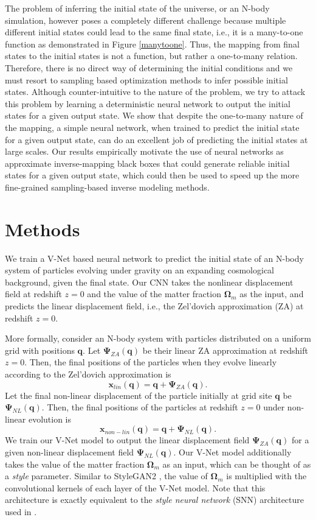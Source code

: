 \documentclass[10pt]{article}
\begin{document}
The problem of inferring the initial state of the universe, or an N-body simulation, however poses a completely different challenge because multiple different initial states could lead to the same final state, i.e., it is a many-to-one function as demonstrated in Figure \ref{manytoone}. Thus, the mapping from final states to the initial states is not a function, but rather a one-to-many relation. Therefore, there is no direct way of determining the initial conditions and we must resort to sampling based optimization methods to infer possible initial states. Although counter-intuitive to the nature of the problem, we try to attack this problem by learning a deterministic neural network to output the initial states for a given output state. We show that despite the one-to-many nature of the mapping, a simple neural network, when trained to predict the initial state for a given output state, can do an excellent job of predicting the initial states at large scales. Our results empirically motivate the use of neural networks as approximate inverse-mapping black boxes that could generate reliable initial states for a given output state, which could then be used to speed up the more fine-grained sampling-based inverse modeling methods.

\section{Methods}

We train a V-Net based neural network to predict the initial state of an N-body system of particles evolving under gravity on an expanding cosmological background, given the final state. Our CNN takes the nonlinear displacement field at redshift $z=0$ and the value of the matter fraction $\mathbf{\Omega}_m$ as the input, and predicts the linear displacement field, i.e., the Zel'dovich approximation (ZA) at redshift $z=0$.

More formally, consider an N-body system with particles distributed on a uniform grid with positions $\mathbf{q}$. Let $\mathbf{\Psi}_{ZA}(\mathbf{q})$ be their linear ZA approximation at redshift $z=0$. Then, the final positions of the particles when they evolve linearly according to the Zel'dovich approximation is
$$\mathbf{x}_{lin}(\mathbf{q}) = \mathbf{q} + \mathbf{\Psi}_{ZA}(\mathbf{q}).$$
Let the final non-linear displacement of the particle initially at grid site $\mathbf{q}$ be $\mathbf{\Psi}_{NL}(\mathbf{q})$. Then, the final positions of the particles at redshift $z=0$ under non-linear evolution is
$$\mathbf{x}_{non-lin}(\mathbf{q}) = \mathbf{q} + \mathbf{\Psi}_{NL}(\mathbf{q}).$$
We train our V-Net model to output the linear displacement field $\mathbf{\Psi}_{ZA}(\mathbf{q})$ for a given non-linear displacement field $\mathbf{\Psi}_{NL}(\mathbf{q})$. Our V-Net model additionally takes the value of the matter fraction $\mathbf{\Omega}_m$ as an input, which can be thought of as a \textit{style} parameter. Similar to StyleGAN2 \cite{stylegan2}, the value of $\mathbf{\Omega}_m$ is multiplied with the convolutional kernels of each layer of the V-Net model. Note that this architecture is exactly equivalent to the \textit{style neural network} (SNN) architecture used in \cite{forward-model}.
\end{document}
